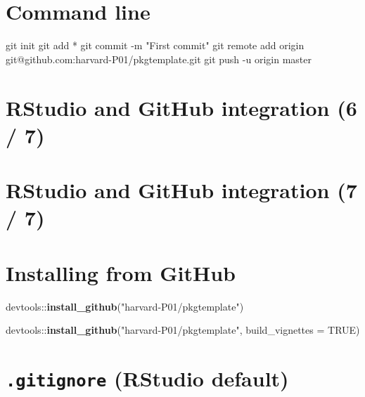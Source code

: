 \documentclass[]{book}
\newenvironment{Shaded}{\begin{snugshade}}{\end{snugshade}}
\newcommand{\KeywordTok}[1]{\textcolor[rgb]{0.13,0.29,0.53}{\textbf{{#1}}}}
\newcommand{\DataTypeTok}[1]{\textcolor[rgb]{0.13,0.29,0.53}{{#1}}}
\newcommand{\StringTok}[1]{\textcolor[rgb]{0.31,0.60,0.02}{{#1}}}
\newcommand{\OtherTok}[1]{\textcolor[rgb]{0.56,0.35,0.01}{{#1}}}
\newcommand{\NormalTok}[1]{{#1}}
\theoremstyle{definition}
\theoremstyle{definition}
\theoremstyle{definition}
\theoremstyle{remark}
\begin{document}
\section{Command line}\label{command-line}

\begin{Shaded}
\begin{Highlighting}[]
\NormalTok{git init}
\NormalTok{git add *}
\NormalTok{git commit -m }\StringTok{"First commit"}
\NormalTok{git remote add origin git@github.com:harvard-P01/pkgtemplate.git}
\NormalTok{git push -u origin master}
\end{Highlighting}
\end{Shaded}

\section{RStudio and GitHub integration (6 /
7)}\label{rstudio-and-github-integration-6-7}

\section{RStudio and GitHub integration (7 /
7)}\label{rstudio-and-github-integration-7-7}

\section{Installing from GitHub}\label{installing-from-github}

\begin{Shaded}
\begin{Highlighting}[]
\NormalTok{devtools::}\KeywordTok{install_github}\NormalTok{(}\StringTok{"harvard-P01/pkgtemplate"}\NormalTok{)}
\end{Highlighting}
\end{Shaded}

\begin{Shaded}
\begin{Highlighting}[]
\NormalTok{devtools::}\KeywordTok{install_github}\NormalTok{(}\StringTok{"harvard-P01/pkgtemplate"}\NormalTok{,}
                         \DataTypeTok{build_vignettes =} \OtherTok{TRUE}\NormalTok{)}
\end{Highlighting}
\end{Shaded}

\section{\texorpdfstring{\texttt{.gitignore} (RStudio
default)}{.gitignore (RStudio default)}}\label{gitignore-rstudio-default}
\end{document}
